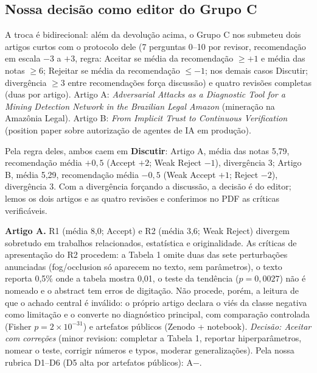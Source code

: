\documentclass[10pt,a4paper,twocolumn]{article}
\begin{document}
\subsection{Nossa decisão como editor do Grupo C}

A troca é bidirecional: além da devolução acima, o Grupo C nos submeteu dois artigos curtos com o protocolo dele (7 perguntas 0--10 por revisor, recomendação em escala $-3$ a $+3$, regra: Aceitar se média da recomendação $\geq +1$ e média das notas $\geq 6$; Rejeitar se média da recomendação $\leq -1$; nos demais casos Discutir; divergência $\geq 3$ entre recomendações força discussão) e quatro revisões completas (duas por artigo). Artigo A: \emph{Adversarial Attacks as a Diagnostic Tool for a Mining Detection Network in the Brazilian Legal Amazon} (mineração na Amazônia Legal). Artigo B: \emph{From Implicit Trust to Continuous Verification} (position paper sobre autorização de agentes de IA em produção).

Pela regra deles, ambos caem em \textbf{Discutir}: Artigo A, média das notas 5,79, recomendação média $+0{,}5$ (Accept $+2$; Weak Reject $-1$), divergência 3; Artigo B, média 5,29, recomendação média $-0{,}5$ (Weak Accept $+1$; Reject $-2$), divergência 3. Com a divergência forçando a discussão, a decisão é do editor; lemos os dois artigos e as quatro revisões e conferimos no PDF as críticas verificáveis.

\textbf{Artigo A.} R1 (média 8,0; Accept) e R2 (média 3,6; Weak Reject) divergem sobretudo em trabalhos relacionados, estatística e originalidade. As críticas de apresentação do R2 procedem: a Tabela 1 omite duas das sete perturbações anunciadas (fog/occlusion só aparecem no texto, sem parâmetros), o texto reporta 0,5\% onde a tabela mostra 0,01, o teste da tendência ($p = 0{,}0027$) não é nomeado e o abstract tem erros de digitação. Não procede, porém, a leitura de que o achado central é inválido: o próprio artigo declara o viés da classe negativa como limitação e o converte no diagnóstico principal, com comparação controlada (Fisher $p = 2\times10^{-31}$) e artefatos públicos (Zenodo + notebook). \emph{Decisão: Aceitar com correções} (minor revision: completar a Tabela 1, reportar hiperparâmetros, nomear o teste, corrigir números e typos, moderar generalizações). Pela nossa rubrica D1--D6 (D5 alta por artefatos públicos): A$-$.
\end{document}
